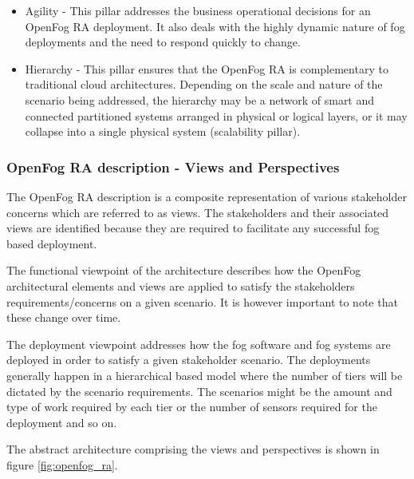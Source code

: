 \documentclass{article}
\begin{document}
\begin{itemize}
\item Agility - This pillar addresses the business operational decisions for an OpenFog RA deployment. It also deals with the highly dynamic nature of fog deployments and the need to respond quickly to change\cite{openfogconsortium2017}.

\item Hierarchy - This pillar ensures that the OpenFog RA is complementary to traditional cloud architectures. Depending on the scale and nature of the scenario being addressed, the hierarchy may be a network of smart and connected partitioned systems arranged in physical or logical layers, or it may collapse into a single physical system (scalability pillar)\cite{openfogconsortium2017}.
\end{itemize}  

\subsubsection{OpenFog RA description - Views and Perspectives}

The OpenFog RA description is a composite representation of various stakeholder concerns which are referred to as views\cite{openfogconsortium2017}. The stakeholders and their associated views are identified because they are required to facilitate any successful fog based deployment\cite{openfogconsortium2017}. 

The functional viewpoint of the architecture describes how the OpenFog architectural elements and views are applied to satisfy the stakeholders requirements/concerns on a given scenario. It is however important to note that these change over time. 

The deployment viewpoint addresses how the fog software and fog systems are deployed in order to satisfy a given stakeholder scenario. The deployments generally happen in a hierarchical based model where the number of tiers will be dictated by the scenario requirements\cite{openfogconsortium2017}.
The scenarios might be the amount and type of work required by each tier or the number of sensors required for the deployment and so on.

The abstract architecture comprising the views and perspectives is shown in figure \ref{fig:openfog_ra}.
\end{document}
